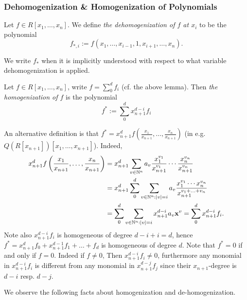 \subsubsection{Dehomogenization \& Homogenization of Polynomials}
\begin{definition}
    Let $f\in R[x_1,\dots,x_{n}]$. We define \textit{the dehomogenization of $f$ at $x_i$} to be the polynomial 
    $$f_{\ast,i}:=f(x_1,\dots,x_{i-1},1,x_{i+1},\dots,x_n).$$
\end{definition}
\begin{remark}
    We write $f_\ast$ when it is implicitly understood with respect to what variable dehomogenization is applied. 
\end{remark}
\begin{definition}
    Let $f\in R[x_1,\dots, x_n]$, write $f=\sum_0^df_i$ (cf. the above lemma). Then \textit{the homogenization of $f$} is the polynomial
    $$f^\ast := \sum_0^d x_{n+1}^{d-i}f_i $$
\end{definition}
\begin{remark}\label{AnAlternativeDefinitionAndPreimageOfHomogenizationOfZeroIsZero}
    An alternative definition is that $f^\ast = x_{n+1}^df\left(\frac{x_1}{x_{n+1}},\dots,\frac{x_n}{x_{n+1}}\right)$ (in e.g. $Q(R[x_{n+1}])[x_1,\dots,x_{n+1}]$). Indeed,
    \begin{align*}
        x_{n+1}^df\left(\frac{x_1}{x_{n+1}},\dots,\frac{x_n}{x_{n+1}}\right) &= x_{n+1}^d\sum_{v\in \mathbb{N}^n} a_v\frac{x_1^{v_1}}{x_{n+1}^{v_1}}\cdots \frac{x_n^{v_n}}{x_{n+1}^{v_n}}\\ &=x_{n+1}^d\sum_{0}^d \sum_{v\in \mathbb{N}^n: \vert v\vert =i} a_v\frac{x_1^{v_1}\cdots x_n^{v_n}}{x_{n+1}^{v_1+\dots + v_n}}\\ 
        &= \sum_0^d \sum_{v\in\mathbb{N}^n:\vert v\vert =i} x_{n+1}^{d-i} a_v\mathbf{x}^v = \sum_0^d x_{n+1}^{d-i}f_i.
    \end{align*}
    Note also $x_{n+1}^{d-i}f_i$ is homogeneous of degree $d-i+i=d$, hence $f^\ast=x_{n+1}^d f_0+x_{n+1}^{d-1}f_1+\dots+f_d$ is homogeneous of degree $d$. Note that $f^\ast = 0$ if and only if $f = 0$. Indeed if $f\neq 0$, Then $x_{n+1}^{d-i}f_i\neq 0$, furthermore any monomial in $x_{n+1}^{d-i}f_i$ is different from any monomial in $x_{n+1}^{d-j} f_j$ since their $x_{n+1}$-degree is $d-i$ resp. $d-j$. 
\end{remark}
We observe the following facts about homogenization and de-homogenization.
